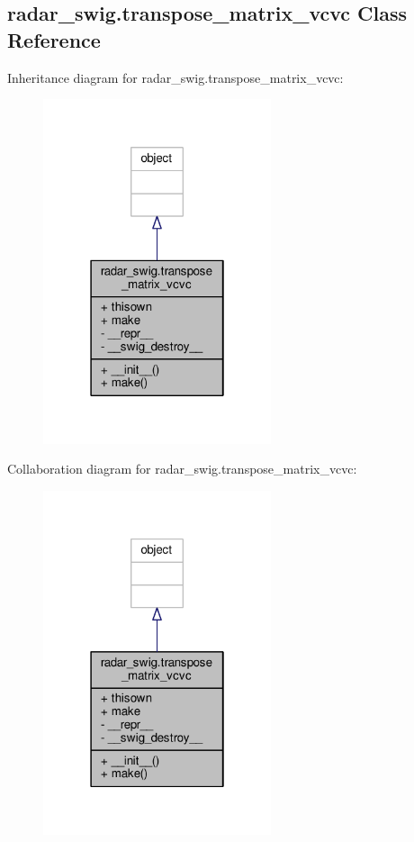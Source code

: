 \subsection{radar\+\_\+swig.\+transpose\+\_\+matrix\+\_\+vcvc Class Reference}
\label{classradar__swig_1_1transpose__matrix__vcvc}


Inheritance diagram for radar\+\_\+swig.\+transpose\+\_\+matrix\+\_\+vcvc\+:
\nopagebreak
\begin{figure}[H]
\begin{center}
\leavevmode
\includegraphics[width=190pt]{d2/d39/classradar__swig_1_1transpose__matrix__vcvc__inherit__graph}
\end{center}
\end{figure}


Collaboration diagram for radar\+\_\+swig.\+transpose\+\_\+matrix\+\_\+vcvc\+:
\nopagebreak
\begin{figure}[H]
\begin{center}
\leavevmode
\includegraphics[width=190pt]{da/dfe/classradar__swig_1_1transpose__matrix__vcvc__coll__graph}
\end{center}
\end{figure}
